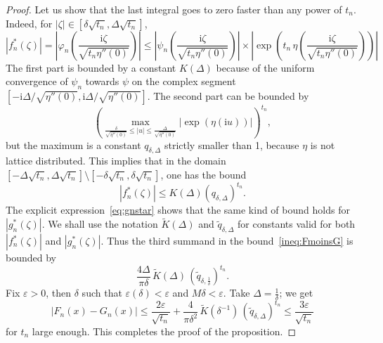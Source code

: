 \documentclass[12pt,a4paper,reqno]{amsart}
\theoremstyle{remark}
\newcommand{\I}{\mathrm{i}}
\newcommand{\eps}{\varepsilon}
\begin{document}
\begin{proof}
Let us show that the last integral goes to zero faster than any power of $t_{n}$. Indeed, for $|\zeta| \in [\delta\sqrt{t_{n}},\Delta\sqrt{t_{n}}]$,
$$|f_{n}^*(\zeta)|=\left|\varphi_{n}\left(\frac{\I \zeta}{\sqrt{t_{n}\eta''(0)}}\right)\right|\leq
 \left|\psi_n \!\left(\frac{\I \zeta}{\sqrt{t_{n}\eta''(0)}}\right) \right|
\times
 \left| \exp \!\left(t_n\, \eta\! \left(\frac{\I \zeta}{\sqrt{t_{n}\eta''(0)}}\right) \right) \right| 
 $$
The first part is bounded by a constant $K(\Delta)$ because of the uniform convergence of $\psi_n$ towards $\psi$ on the complex segment $[-\I\Delta/\sqrt{\eta''(0)},\I\Delta/\sqrt{\eta''(0)}]$. The second part can be bounded by
\[\left(\max_{\frac{\delta}{\sqrt{\eta''(0)}} \leq |u| \leq \frac{\Delta}{\sqrt{\eta''(0)}}} |\exp(\eta(\I u))|\right)^{\!t_{n}},\]
but the maximum is a constant $q_{\delta,\Delta}$ strictly smaller than 1, because $\eta$ is not lattice distributed. This implies that in the domain 
$[-\Delta\sqrt{t_{n}},\Delta\sqrt{t_{n}}]\setminus[-\delta\sqrt{t_{n}},\delta\sqrt{t_{n}}]$,
one has the bound
\[|f_{n}^*(\zeta)| \le K(\Delta) (q_{\delta,\Delta})^{t_n}.\]
The explicit expression~\eqref{eq:gnstar} shows that the same kind of bound holds for $|g_{n}^*(\zeta)|$. We shall use the notation $\widetilde{K}(\Delta)$ and $\widetilde{q}_{\delta,\Delta}$ for constants valid for both $|f_{n}^*(\zeta)|$ and $|g_{n}^*(\zeta)|$. Thus the third summand in the bound~\eqref{ineq:FmoinsG} is bounded by 
$$\frac{4 \Delta}{\pi \delta}\, \widetilde{K}(\Delta) \,(\widetilde{q}_{\delta,\frac{1}{\delta}})^{t_{n}}.$$
Fix $\eps>0$, then $\delta$ such that $\eps(\delta)<\eps$ and $M\delta<\eps$. Take $\Delta=\frac{1}{\delta}$; we get
$$|F_{n}(x)-G_{n}(x)| \leq \frac{2\eps}{\sqrt{t_{n}}}+\frac{4}{\pi\delta^2}\,\widetilde{K}(\delta^{-1})\,(\widetilde{q}_{\delta,\Delta})^{t_{n}} \leq \frac{3\eps}{\sqrt{t_{n}}}$$
for $t_{n}$ large enough. This completes the proof of the proposition.
\end{proof}
\medskip
\end{document}
